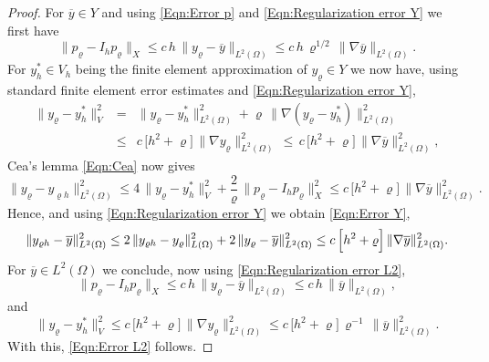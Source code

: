\documentclass[10pt,a4paper]{amsart}
\begin{document}
\begin{proof}
  For $\overline{y} \in Y$ and using \eqref{Eqn:Error p} and
  \eqref{Eqn:Regularization error Y} we first have
  \[
    \| p_\varrho - I_h p_\varrho \|_X \leq
    c \, h \, \| y_\varrho - \overline{y} \|_{L^2(\Omega)} \leq
    c \, h \, \varrho^{1/2} \, \| \nabla \overline{y} \|_{L^2(\Omega)} .
  \]
  For $y_h^* \in V_h$ being the finite element approximation of
  $y_\varrho \in Y$ we now have, using standard finite element error
  estimates and \eqref{Eqn:Regularization error Y},
  \begin{eqnarray*}
    \| y_\varrho - y_h^* \|_V^2
    & = & \| y_\varrho - y_h^* \|_{L^2(\Omega)}^2 + \varrho \,
          \| \nabla (y_\varrho - y_h^*) \|^2_{L^2(\Omega)} \\
    & \leq & c \, \Big[ h^2 + \varrho \Big] \,
             \| \nabla y_\varrho \|^2_{L^2(\Omega)} \, \leq \,
             c \, \Big[ h^2 + \varrho \Big] \,
             \| \nabla \overline{y} \|^2_{L^2(\Omega)},
  \end{eqnarray*}
  Cea's lemma \eqref{Eqn:Cea} now gives
  \[
    \| y_\varrho - y_{\varrho h} \|^2_{L^2(\Omega)}
    \leq 4 \, \| y_\varrho - y_h^* \|_V^2 + \frac{2}{\varrho} \,
    \| p_\varrho - I_h p_\varrho \|_X^2 \leq
    c \, \Big[ h^2 + \varrho \Big] \,
    \| \nabla \overline{y} \|^2_{L^2(\Omega)} .
  \]
  Hence, and using \eqref{Eqn:Regularization error Y} we
  obtain \eqref{Eqn:Error Y},
  \[
    \| y_{\varrho h} - \overline{y} \|_{L^2(\Omega)}^2
    \leq 2 \, \| y_{\varrho h} - y_\varrho \|^2_{L(\Omega)} +
    2 \, \| y_\varrho - \overline{y} \|^2_{L^2(\Omega)} \\
    \leq c \, \Big[ h^2 + \varrho \Big] \,
    \| \nabla \overline{y} \|^2_{L^2(\Omega)} .
  \]
  For $\overline{y} \in L^2(\Omega)$ we conclude,
  now using \eqref{Eqn:Regularization error L2},
   \[
    \| p_\varrho - I_h p_\varrho \|_X \leq
    c \, h \, \| y_\varrho - \overline{y} \|_{L^2(\Omega)} \leq
    c \, h \, \| \overline{y} \|_{L^2(\Omega)} ,
  \]
  and
  \[
    \| y_\varrho - y_h^* \|_V^2 \leq c \, \Big[ h^2 + \varrho \Big] \,
    \| \nabla y_\varrho \|^2_{L^2(\Omega)}
    \leq c \, \Big[ h^2 + \varrho \Big] \, \varrho^{-1} \,
    \| \overline{y} \|^2_{L^2(\Omega)} .
  \]
  With this, \eqref{Eqn:Error L2} follows.
\end{proof}
\end{document}

